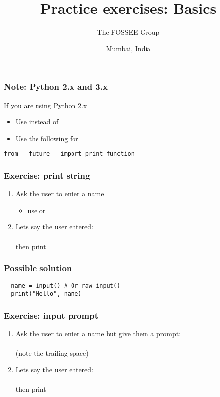 \documentclass[14pt,compress]{beamer}
\title[Basic Python]{Practice exercises: Basics}
\author[FOSSEE Team] {The FOSSEE Group}
\institute[FOSSEE -- IITB] {Department of Aerospace Engineering\\IIT Bombay}
\date[] {Mumbai, India}
\begin{document}
\begin{frame}
  \titlepage
\end{frame}

\begin{frame}
  \frametitle{Note: Python 2.x and 3.x}

 If you are using Python 2.x
  \begin{itemize}
  \item Use  instead of 
  \item Use the following for 
  \end{itemize}
 \begin{lstlisting}
from __future__ import print_function
\end{lstlisting}
\end{frame}

\begin{frame}[plain]
  \frametitle{Exercise: print string}
  \begin{enumerate}
  \item Ask the user to enter a name
    \begin{itemize}
    \item use  or 
    \end{itemize}
  \item Lets say the user entered: \\ \\  then print \\ 
  \end{enumerate}
\end{frame}

\begin{frame}
\frametitle{Possible solution}
\begin{lstlisting}
  name = input() # Or raw_input()
  print("Hello", name)
\end{lstlisting}

\end{frame}


\begin{frame}[plain]
  \frametitle{Exercise: input prompt}
  \begin{enumerate}
  \item Ask the user to enter a name but give them a prompt:\\  \\ (note the trailing space)
  \item Lets say the user entered: \\ \\  then print \\ 
  \end{enumerate}
\end{frame}
\end{document}
